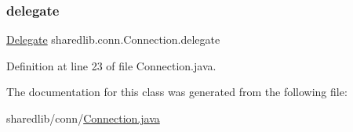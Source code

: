 \subsubsection{\texorpdfstring{delegate}{delegate}}
{\footnotesize\ttfamily \hyperlink{interfacesharedlib_1_1conn_1_1_connection_1_1_delegate}{Delegate} sharedlib.\+conn.\+Connection.\+delegate}



Definition at line 23 of file Connection.\+java.



The documentation for this class was generated from the following file\+:\begin{DoxyCompactItemize}
\item 
sharedlib/conn/\hyperlink{_connection_8java}{Connection.\+java}\end{DoxyCompactItemize}

